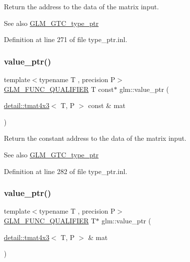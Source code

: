 Return the address to the data of the matrix input. \begin{DoxySeeAlso}{See also}
\hyperlink{group__gtc__type__ptr}{G\+L\+M\+\_\+\+G\+T\+C\+\_\+type\+\_\+ptr} 
\end{DoxySeeAlso}


Definition at line 271 of file type\+\_\+ptr.\+inl.

\mbox{\label{group__gtc__type__ptr_gaebe5b66d8b05f6ace85d26cedd03732d}} 
\subsubsection{\texorpdfstring{value\+\_\+ptr()}{value\_ptr()}\hspace{0.1cm}{\footnotesize\ttfamily [24/27]}}
{\footnotesize\ttfamily template$<$typename T , precision P$>$ \\
\hyperlink{setup_8hpp_a33fdea6f91c5f834105f7415e2a64407}{G\+L\+M\+\_\+\+F\+U\+N\+C\+\_\+\+Q\+U\+A\+L\+I\+F\+I\+ER} T const$\ast$ glm\+::value\+\_\+ptr (\begin{DoxyParamCaption}\item[{\hyperlink{structglm_1_1detail_1_1tmat4x3}{detail\+::tmat4x3}$<$ T, P $>$ const \&}]{mat }\end{DoxyParamCaption})}

Return the constant address to the data of the matrix input. \begin{DoxySeeAlso}{See also}
\hyperlink{group__gtc__type__ptr}{G\+L\+M\+\_\+\+G\+T\+C\+\_\+type\+\_\+ptr} 
\end{DoxySeeAlso}


Definition at line 282 of file type\+\_\+ptr.\+inl.

\mbox{\label{group__gtc__type__ptr_ga4a4b23867cc26441441ff4458844fa27}} 
\subsubsection{\texorpdfstring{value\+\_\+ptr()}{value\_ptr()}\hspace{0.1cm}{\footnotesize\ttfamily [25/27]}}
{\footnotesize\ttfamily template$<$typename T , precision P$>$ \\
\hyperlink{setup_8hpp_a33fdea6f91c5f834105f7415e2a64407}{G\+L\+M\+\_\+\+F\+U\+N\+C\+\_\+\+Q\+U\+A\+L\+I\+F\+I\+ER} T$\ast$ glm\+::value\+\_\+ptr (\begin{DoxyParamCaption}\item[{\hyperlink{structglm_1_1detail_1_1tmat4x3}{detail\+::tmat4x3}$<$ T, P $>$ \&}]{mat }\end{DoxyParamCaption})}

